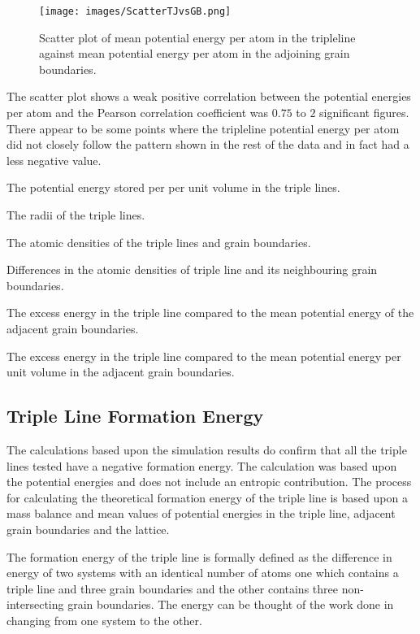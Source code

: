 \documentclass[12pt,a4paper]{book}
\begin{document}
\begin{figure}[H]
	\texttt{[image: images/ScatterTJvsGB.png]} 
	\label{fig:ScatterTJvsGB}
	\caption{Scatter plot of mean potential energy per atom in the tripleline against mean potential energy per atom in the adjoining grain boundaries.}
\end{figure}

The scatter plot shows a weak positive correlation between the potential energies per atom and the Pearson correlation coefficient was $0.75$ to $2$ significant figures. There appear to be some points where the tripleline potential energy per atom did not closely follow the pattern shown in the rest of the data and in fact had a less negative value. 

The potential energy stored per per unit volume in the triple lines.

The radii of the triple lines.

The atomic densities of the triple lines and grain boundaries.

Differences in the atomic densities of triple line and its neighbouring grain boundaries.

The excess energy in the triple line compared to the mean potential energy of the adjacent grain boundaries.

The excess energy in the triple line compared to the mean potential energy per unit volume in the adjacent grain boundaries. 



\subsection{Triple Line Formation Energy}

The calculations based upon the simulation results do confirm that all the triple lines tested have a negative formation energy. The calculation was based upon the potential energies and does not include an entropic contribution. The process for calculating the theoretical formation energy of the triple line is based upon a mass balance and mean values of potential energies in the triple line, adjacent grain boundaries and the lattice.

The formation energy of the triple line is formally defined as the difference in energy of two systems with an identical number of atoms one which contains a triple line and three grain boundaries and the other contains three non-intersecting grain boundaries. The energy can be thought of the work done in changing from one system to the other.
\end{document}
